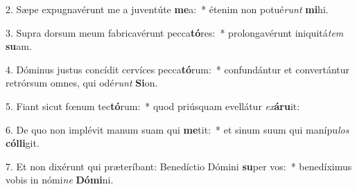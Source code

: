 2. Sæpe expugnavérunt me a juventúte \textbf{me}a:~*  étenim non potué\textit{runt} \textbf{mi}hi.\

3. Supra dorsum meum fabricavérunt pecca\textbf{tó}res:~*  prolongavérunt iniquitá\textit{tem} \textbf{su}am.\

4. Dóminus justus concídit cervíces pecca\textbf{tó}rum:~*  confundántur et convertántur retrórsum omnes, qui odé\textit{runt} \textbf{Si}on.\

5. Fiant sicut fœnum tec\textbf{tó}rum:~*  quod priúsquam evellátur \textit{ex}\textbf{á}\textbf{ru}it:\

6. De quo non implévit manum suam qui \textbf{me}tit:~*  et sinum suum qui manípu\textit{los} \textbf{cól}\textbf{li}git.\

7. Et non dixérunt qui præteríbant: Benedíctio Dómini \textbf{su}per vos:~*  benedíximus vobis in nómi\textit{ne} \textbf{Dó}\textbf{mi}ni.\

